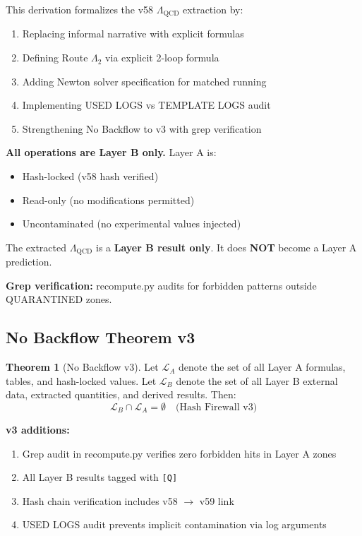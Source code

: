 \documentclass[11pt,a4paper]{article}
\theoremstyle{definition}
\newtheorem{theorem}{Theorem}[section]
\begin{document}
This derivation formalizes the v58 $\Lambda_{\text{QCD}}$ extraction by:
\begin{enumerate}
  \item Replacing informal narrative with explicit formulas
  \item Defining Route $\Lambda_2$ via explicit 2-loop formula
  \item Adding Newton solver specification for matched running
  \item Implementing USED LOGS vs TEMPLATE LOGS audit
  \item Strengthening No Backflow to v3 with grep verification
\end{enumerate}

\begin{firewallbox}
\textbf{All operations are Layer B only.} Layer A is:
\begin{itemize}
  \item Hash-locked (v58 hash verified)
  \item Read-only (no modifications permitted)
  \item Uncontaminated (no experimental values injected)
\end{itemize}

The extracted $\Lambda_{\text{QCD}}$ is a \textbf{Layer B result only}.
It does \textbf{NOT} become a Layer A prediction.

\textbf{Grep verification:} recompute.py audits for forbidden patterns
outside QUARANTINED zones.
\end{firewallbox}

\subsection{No Backflow Theorem v3}
\label{subsec:no-backflow-v3}

\begin{theorem}[No Backflow v3]
\label{thm:no-backflow-v3}
Let $\mathcal{L}_A$ denote the set of all Layer A formulas, tables, and
hash-locked values. Let $\mathcal{L}_B$ denote the set of all Layer B
external data, extracted quantities, and derived results. Then:
\begin{equation}
\label{eq:no-backflow-v3}
\boxed{\mathcal{L}_B \cap \mathcal{L}_A = \emptyset \quad \text{(Hash Firewall v3)}}
\end{equation}

\textbf{v3 additions:}
\begin{enumerate}
  \item Grep audit in recompute.py verifies zero forbidden hits in Layer A zones
  \item All Layer B results tagged with \texttt{[Q]}
  \item Hash chain verification includes v58 $\to$ v59 link
  \item USED LOGS audit prevents implicit contamination via log arguments
\end{enumerate}
\end{theorem}
\end{document}
